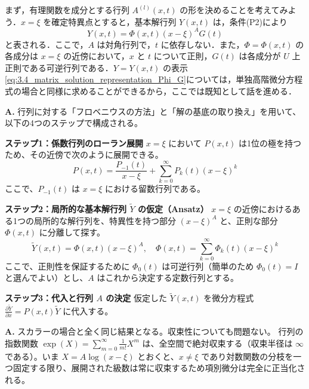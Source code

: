 まず，有理関数を成分とする行列 $A^{(l)}(x,t)$ の形を決めることを考えてみよう．$x=\xi$ を確定特異点とすると，基本解行列 $Y(x,t)$ は，条件(P2)により
\begin{equation}\label{eq:3.4_matrix_solution_representation_Phi_G}
  Y(x,t) = \Phi(x,t)(x-\xi)^A G(t)
\end{equation}
と表される．ここで，$A$ は対角行列で，$t$ に依存しない．また，$\Phi=\Phi(x,t)$ の各成分は $x=\xi$ の近傍において，$x$ と $t$ について正則，$G(t)$ は各成分が $U$ 上正則である可逆行列である．$Y=Y(x,t)$ の表示\eqref{eq:3.4_matrix_solution_representation_Phi_G}については，単独高階微分方程式の場合と同様に求めることができるから，ここでは既知として話を進める．

\begin{Q}[係数行列 $P(x,t)$ が特異点 $x=\xi$ において高々1位の極（フックス型特異点）を持つと仮定したとき、基本解行列が局所表示 $Y(x,t) = \Phi(x,t)(x-\xi)^A G(t)$ を持つことは、具体的にどのように証明（構成）されるか？]
\textbf{A.} 行列に対する「フロベニウスの方法」と「解の基底の取り換え」を用いて、以下の4つのステップで構成される。

\textbf{ステップ1：係数行列のローラン展開}
$x=\xi$ において $P(x,t)$ は1位の極を持つため、その近傍で次のように展開できる。
\[
  P(x,t) = \frac{P_{-1}(t)}{x-\xi} + \sum_{k=0}^{\infty} P_k(t) (x-\xi)^k
\]
ここで、$P_{-1}(t)$ は $x=\xi$ における留数行列である。

\textbf{ステップ2：局所的な基本解行列 $\tilde{Y}$ の仮定（Ansatz）}
$x=\xi$ の近傍におけるある1つの局所的な解行列を、特異性を持つ部分 $(x-\xi)^A$ と、正則な部分 $\Phi(x,t)$ に分離して探す。
\[
  \tilde{Y}(x,t) = \Phi(x,t)(x-\xi)^A, \quad \Phi(x,t) = \sum_{k=0}^{\infty} \Phi_k(t) (x-\xi)^k
\]
ここで、正則性を保証するために $\Phi_0(t)$ は可逆行列（簡単のため $\Phi_0(t) = I$ と選んでよい）とし、$A$ はこれから決定する定数行列とする。

\textbf{ステップ3：代入と行列 $A$ の決定}
仮定した $\tilde{Y}(x,t)$ を微分方程式 $\frac{\partial \tilde{Y}}{\partial x} = P(x,t)\tilde{Y}$ に代入する。

\begin{Q}
\textbf{A.} スカラーの場合と全く同じ結果となる。収束性についても問題ない。
行列の指数関数 $\exp(X) = \sum_{m=0}^{\infty} \frac{1}{m!} X^m$ は、全空間で絶対収束する（収束半径は $\infty$ である）。いま $X = A \log(x-\xi)$ とおくと、$x \neq \xi$ であり対数関数の分枝を一つ固定する限り、展開された級数は常に収束するため項別微分は完全に正当化される。


\end{Q}
\end{Q}
